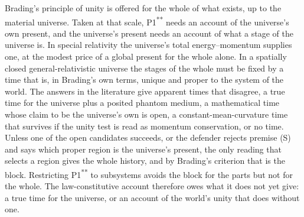\documentclass[11pt]{article}
\begin{document}
Brading's principle of unity is offered for the whole of what exists, up to the
material universe. Taken at that scale, P1\textsuperscript{**} needs an account of
the universe's own present, and the universe's present needs an account of what a
stage of the universe is. In special relativity the universe's total
energy--momentum supplies one, at the modest price of a global present for the
whole alone. In a spatially closed general-relativistic universe the stages of the
whole must be fixed by a time that is, in Brading's own terms, unique and proper to
the system of the world. The answers in the literature give apparent times that
disagree, a true time for the universe plus a posited phantom medium, a
mathematical time whose claim to be the universe's own is open, a
constant-mean-curvature time that survives if the unity test is read as momentum
conservation, or no time. Unless one of the open candidates succeeds, or the
defender rejects premise (S) and says which proper region is the universe's
present, the only reading that selects a region gives the whole history, and by
Brading's criterion that is the block. Restricting P1\textsuperscript{**} to subsystems
avoids the block for the parts but not for the whole. The law-constitutive account
therefore owes what it does not yet give: a true time for the universe, or an
account of the world's unity that does without one.



\end{document}
